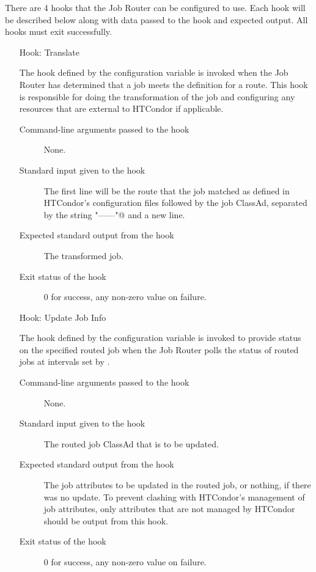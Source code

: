 There are 4 hooks that the Job Router can be configured to use.
Each hook will be described below along with data passed 
to the hook and expected output.
All hooks must exit successfully.

\begin{itemize}
\item[Hook: Translate]

  The hook defined by the configuration variable 
  is invoked when the Job Router has determined that a job
  meets the definition for a route.  This hook is responsible for doing the
  transformation of the job and configuring any resources that are external to
  HTCondor if applicable.

\begin{description}
\item[Command-line arguments passed to the hook]
  None.
\item[Standard input given to the hook]
  The first line will be the route that the job matched as
  defined in HTCondor's configuration files followed by the job ClassAd,
  separated by the string \verb@"------"@ and a new line.
\item[Expected standard output from the hook]
  The transformed job.
\item[Exit status of the hook]
  0 for success, any non-zero value on failure.
\end{description}


\item[Hook: Update Job Info]

  The hook defined by the configuration variable 
  is invoked to provide status on the specified routed job
  when the Job Router polls the status of routed jobs at intervals
  set by .

\begin{description}
\item[Command-line arguments passed to the hook]
  None.
\item[Standard input given to the hook]
  The routed job ClassAd that is to be updated.
\item[Expected standard output from the hook]
   The job attributes to be updated in the routed job,
   or nothing, if there was no update.
   To prevent clashing with HTCondor's management of job attributes,
   only attributes that are not managed by HTCondor should be output
   from this hook.
\item[Exit status of the hook]
  0 for success, any non-zero value on failure.
\end{description}



\end{itemize}
